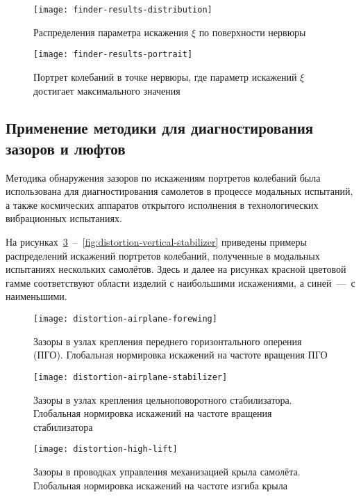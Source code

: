 \begin{figure}[H]
	\centerfloat
	\texttt{[image: finder-results-distribution]}
	\caption{Распределения параметра искажения $ \xi $ по поверхности нервюры} \label{fig:finder-results-distribution}
\end{figure}

\begin{figure}[H]
	\centerfloat
	\texttt{[image: finder-results-portrait]}
	\caption{Портрет колебаний в точке нервюры, где параметр искажений $ \xi $ достигает максимального значения} \label{fig:finder-results-portrait}
\end{figure}

\subsection{Применение методики для диагностирования зазоров и люфтов}

Методика обнаружения зазоров по искажениям портретов колебаний была использована для диагностирования самолетов в процессе модальных испытаний, а также космических аппаратов открытого исполнения в технологических вибрационных испытаниях. 

На рисунках~\ref{fig:distortion-airplane-forewing}~--~\ref{fig:distortion-vertical-stabilizer} приведены примеры распределений искажений портретов колебаний, полученные в модальных испытаниях нескольких самолётов. Здесь и далее на рисунках красной цветовой гамме соответствуют области изделий с наибольшими искажениями, а синей~---~с наименьшими. 

\begin{figure}[!htb]
	\centerfloat
	\texttt{[image: distortion-airplane-forewing]}
	\caption{Зазоры в узлах крепления переднего горизонтального оперения (ПГО). Глобальная нормировка искажений на частоте вращения ПГО} \label{fig:distortion-airplane-forewing}
\end{figure}

\begin{figure}[!htb]
	\centerfloat
	\texttt{[image: distortion-airplane-stabilizer]}
	\caption{Зазоры в узлах крепления цельноповоротного стабилизатора. Глобальная нормировка искажений на частоте вращения стабилизатора} \label{fig:distortion-airplane-stabilizer}
\end{figure}

\begin{figure}[!htb]
	\centerfloat
	\texttt{[image: distortion-high-lift]}
	\caption{Зазоры в проводках управления механизацией крыла самолёта. Глобальная нормировка искажений на частоте изгиба крыла} \label{fig:distortion-high-lift}
\end{figure}

